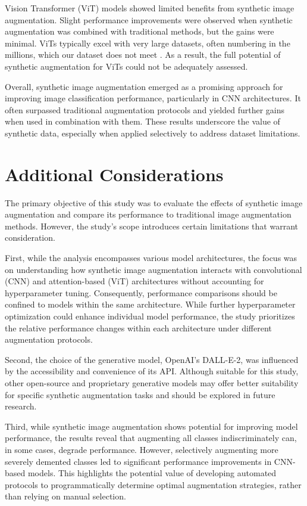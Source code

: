 \documentclass [MAS] {uclathes}
\begin{document}
Vision Transformer (ViT) models showed limited benefits from synthetic image augmentation. Slight performance 
improvements were observed when synthetic augmentation was combined with traditional methods, but the gains were 
minimal. ViTs typically excel with very large datasets, often numbering in the millions, which our dataset does not 
meet \cite{vit_data_req}. As a result, the full potential of synthetic augmentation for ViTs could not be adequately 
assessed.

Overall, synthetic image augmentation emerged as a promising approach for improving image classification performance, 
particularly in CNN architectures. It often surpassed traditional augmentation protocols and yielded further gains when 
used in combination with them. These results underscore the value of synthetic data, especially when applied selectively 
to address dataset limitations.

\chapter{Additional Considerations}

The primary objective of this study was to evaluate the effects of synthetic image augmentation and compare its 
performance to traditional image augmentation methods. However, the study's scope introduces certain limitations that 
warrant consideration.

First, while the analysis encompasses various model architectures, the focus was on understanding how synthetic image 
augmentation interacts with convolutional (CNN) and attention-based (ViT) architectures without accounting for 
hyperparameter tuning. Consequently, performance comparisons should be confined to models within the same architecture. 
While further hyperparameter optimization could enhance individual model performance, the study prioritizes the relative 
performance changes within each architecture under different augmentation protocols.

Second, the choice of the generative model, OpenAI's DALL-E-2, was influenced by the accessibility and convenience of 
its API. Although suitable for this study, other open-source and proprietary generative models may offer better 
suitability for specific synthetic augmentation tasks and should be explored in future research.

Third, while synthetic image augmentation shows potential for improving model performance, the results reveal that 
augmenting all classes indiscriminately can, in some cases, degrade performance. However, selectively augmenting more 
severely demented classes led to significant performance improvements in CNN-based models. This highlights the potential 
value of developing automated protocols to programmatically determine optimal augmentation strategies, rather than 
relying on manual selection.
\end{document}
